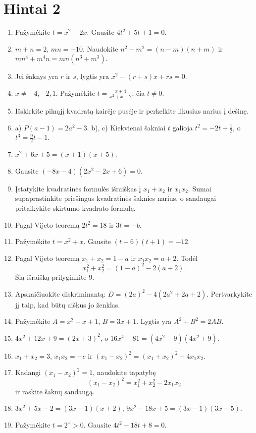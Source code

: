 \documentclass[11pt,a4paper]{scrartcl}
\begin{document}
\section{Hintai 2}
\begin{enumerate}
    \item Pažymėkite $t=x^2-2x$. Gausite $4t^2+5t+1=0$.
    \item $m+n=2$, $mn=-10$.
    Naudokite $n^2-m^2=(n-m)(n+m)$ ir
    $mn^4+m^4n=mn(n^3+m^3)$.
    \item Jei šaknys yra $r$ ir $s$, lygtis yra
    $x^2-(r+s)x+rs=0$.
    \item $x\ne-4,-2,1$. Pažymėkite
    $t=\frac{x+4}{x^2+x-2}$; čia $t\ne0$.
    \item Išskirkite pilnąjį kvadratą kairėje pusėje ir perkelkite
    likusius narius į dešinę.
    \item a) $P(a-1)=2a^2-3$.
    b), c) Kiekvienai šakniai $t$ galioja
    $t^2=-2t+\frac12$, o $t^3=\frac92t-1$.
    \item $x^2+6x+5=(x+1)(x+5)$.
    \item Gausite $(-8x-4)(2x^2-2x+6)=0$.
    \item Įstatykite kvadratinės formulės išraiškas į
    $x_1+x_2$ ir $x_1x_2$. Sumai supaprastinkite priešingus
    kvadratinės šaknies narius, o sandaugai pritaikykite
    skirtumo kvadrato formulę.
    \item Pagal Vijeto teoremą $2t^2=18$ ir $3t=-b$.
    \item Pažymėkite $t=x^2+x$. Gausite $(t-6)(t+1)=-12$.
    \item Pagal Vijeto teoremą
    $x_1+x_2=1-a$ ir $x_1x_2=a+2$. Todėl
    \[
    x_1^2+x_2^2=(1-a)^2-2(a+2).
    \]
    Šią išraišką prilyginkite $9$.
    \item Apskaičiuokite diskriminantą:
    $D=(2a)^2-4(2a^2+2a+2)$. Pertvarkykite jį taip, kad būtų
    aiškus jo ženklas.
    \item Pažymėkite $A=x^2+x+1$, $B=3x+1$.
    Lygtis yra $A^2+B^2=2AB$.
    \item $4x^2+12x+9=(2x+3)^2$, o
    $16x^4-81=(4x^2-9)(4x^2+9)$.
    \item $x_1+x_2=3$, $x_1x_2=-c$ ir
    $(x_1-x_2)^2=(x_1+x_2)^2-4x_1x_2$.
    \item Kadangi $(x_1-x_2)^2=1$, naudokite tapatybę
    \[
    (x_1-x_2)^2=x_1^2+x_2^2-2x_1x_2
    \]
    ir raskite šaknų sandaugą.
    \item $3x^2+5x-2=(3x-1)(x+2)$,
    $9x^2-18x+5=(3x-1)(3x-5)$.
    \item Pažymėkite $t=2^x>0$. Gausite $4t^2-18t+8=0$.

\end{enumerate}
\end{document}
